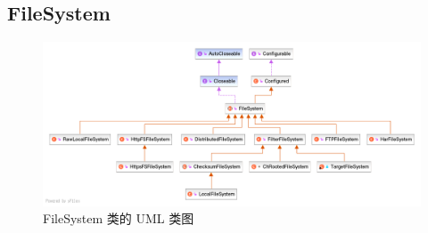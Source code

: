 \subsection{FileSystem}
    \begin{figure}[h]
        \centering
        \includegraphics[width=1\linewidth]{filesystemclass}
        \caption{FileSystem 类的 UML 类图}
        \label{fig:filesystemclass}
    \end{figure}

